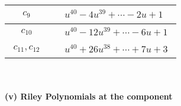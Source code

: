 \documentclass[1p]{elsarticle_modified}
\theoremstyle{definition}
\begin{document}
\begin{tabular}{m{50pt}|m{274pt}}
\hline $$\begin{aligned}c_{9}\end{aligned}$$&$\begin{aligned}
&u^{40}-4 u^{39}+\cdots-2 u+1
\end{aligned}$\\
\hline $$\begin{aligned}c_{10}\end{aligned}$$&$\begin{aligned}
&u^{40}-12 u^{39}+\cdots-6 u+1
\end{aligned}$\\
\hline $$\begin{aligned}c_{11},c_{12}\end{aligned}$$&$\begin{aligned}
&u^{40}+26 u^{38}+\cdots+7 u+3
\end{aligned}$\\
\hline
\end{tabular}\\~\\
\newpage\renewcommand{\arraystretch}{1}
\flushleft \textbf{(v) Riley Polynomials at the component}\newline \\
\end{document}
